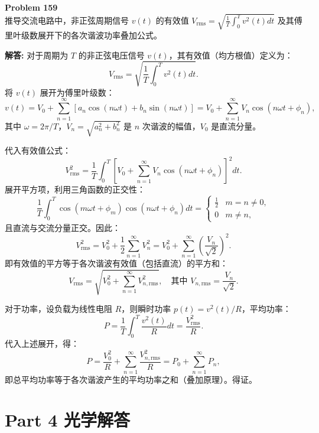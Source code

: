 \documentclass[12pt, a4paper, oneside]{ctexart}
\newenvironment{solution}{\par\noindent\textbf{解答:}\quad}{\par}
\begin{document}
\begin{mdframed}[backgroundcolor=gray!10, linewidth=0pt]
    \textbf{Problem 159} \\
    推导交流电路中，非正弦周期信号 $v(t)$ 的有效值 $V_{\text{rms}} = \sqrt{\frac{1}{T} \int_0^T v^2(t) dt}$ 及其傅里叶级数展开下的各次谐波功率叠加公式。
\end{mdframed}
\begin{solution}
    对于周期为 $T$ 的非正弦电压信号 $v(t)$，其有效值（均方根值）定义为：
    \[
    V_{\text{rms}} = \sqrt{\frac{1}{T} \int_0^T v^2(t) dt}.
    \]
    将 $v(t)$ 展开为傅里叶级数：
    \[
    v(t) = V_0 + \sum_{n=1}^{\infty} \left[ a_n \cos(n\omega t) + b_n \sin(n\omega t) \right] = V_0 + \sum_{n=1}^{\infty} V_n \cos(n\omega t + \phi_n),
    \]
    其中 $\omega = 2\pi/T$，$V_n = \sqrt{a_n^2 + b_n^2}$ 是 $n$ 次谐波的幅值，$V_0$ 是直流分量。

    代入有效值公式：
    \[
    V_{\text{rms}}^2 = \frac{1}{T} \int_0^T \left[ V_0 + \sum_{n=1}^{\infty} V_n \cos(n\omega t + \phi_n) \right]^2 dt.
    \]
    展开平方项，利用三角函数的正交性：
    \[
    \frac{1}{T} \int_0^T \cos(m\omega t + \phi_m) \cos(n\omega t + \phi_n) dt = 
    \begin{cases}
        \frac{1}{2} & m = n \neq 0, \\
        0 & m \neq n,
    \end{cases}
    \]
    且直流与交流分量正交。因此：
    \[
    V_{\text{rms}}^2 = V_0^2 + \frac{1}{2} \sum_{n=1}^{\infty} V_n^2 = V_0^2 + \sum_{n=1}^{\infty} \left( \frac{V_n}{\sqrt{2}} \right)^2.
    \]
    即有效值的平方等于各次谐波有效值（包括直流）的平方和：
    \[
    V_{\text{rms}} = \sqrt{ V_0^2 + \sum_{n=1}^{\infty} V_{n,\text{rms}}^2 }, \quad \text{其中 } V_{n,\text{rms}} = \frac{V_n}{\sqrt{2}}.
    \]

    对于功率，设负载为线性电阻 $R$，则瞬时功率 $p(t) = v^2(t)/R$，平均功率：
    \[
    P = \frac{1}{T} \int_0^T \frac{v^2(t)}{R} dt = \frac{V_{\text{rms}}^2}{R}.
    \]
    代入上述展开，得：
    \[
    P = \frac{V_0^2}{R} + \sum_{n=1}^{\infty} \frac{V_{n,\text{rms}}^2}{R} = P_0 + \sum_{n=1}^{\infty} P_n,
    \]
    即总平均功率等于各次谐波产生的平均功率之和（叠加原理）。得证。
\end{solution}
\newpage
\section*{Part 4 光学解答}
\end{document}
